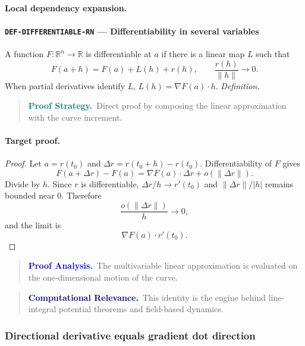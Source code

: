 \documentclass[10pt]{article}
\newcommand{\pidraw}[1]{\begingroup\urlstyle{tt}\nolinkurl{#1}\endgroup}
\theoremstyle{definition}
\theoremstyle{remark}
\newenvironment{proofstrategy}
{\begin{quote}\small\noindent\textbf{\textcolor{teal}{Proof Strategy.}}\ }
{\end{quote}}
\newenvironment{proofanalysis}
{\begin{quote}\small\noindent\textbf{\textcolor{blue}{Proof Analysis.}}\ }
{\end{quote}}
\newenvironment{computationalrelevance}
{\begin{quote}\small\noindent\textbf{\textcolor{navy}{Computational Relevance.}}\ }
{\end{quote}}
\begin{document}
\paragraph{Local dependency expansion.}

\paragraph{\pidraw{DEF-DIFFERENTIABLE-RN} --- Differentiability in several variables}
A function $F:\mathbb{R}^n\to\mathbb{R}$ is differentiable at $a$ if there is a linear map $L$ such that
\[
F(a+h)=F(a)+L(h)+r(h),\qquad \frac{r(h)}{\|h\|}\to0.
\]
When partial derivatives identify $L$, $L(h)=\nabla F(a)\cdot h$.
\textit{Definition.}

\begin{proofstrategy}Direct proof by composing the linear approximation with the curve increment.\end{proofstrategy}

\paragraph{Target proof.}

\begin{proof}

Let $a=r(t_0)$ and $\Delta r=r(t_0+h)-r(t_0)$. Differentiability of $F$ gives
\[
F(a+\Delta r)-F(a)=\nabla F(a)\cdot\Delta r+o(\|\Delta r\|).
\]
Divide by $h$. Since $r$ is differentiable,
$\Delta r/h\to r'(t_0)$ and $\|\Delta r\|/|h|$ remains bounded near $0$.
Therefore
\[
\frac{o(\|\Delta r\|)}{h}\to0,
\]
and the limit is
\[
\nabla F(a)\cdot r'(t_0).
\]

\end{proof}

\begin{proofanalysis}The multivariable linear approximation is evaluated on the one-dimensional motion of the curve.\end{proofanalysis}

\begin{computationalrelevance}This identity is the engine behind line-integral potential theorems and field-based dynamics.\end{computationalrelevance}

\subsubsection{Directional derivative equals gradient dot direction}
\end{document}
